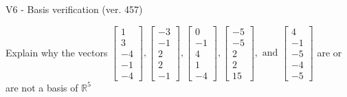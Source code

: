 \begin{exercise}
  \begin{exerciseTitle}V6 - Basis verification (ver. 457)\end{exerciseTitle}
  \begin{exerciseStatement}
    Explain why the vectors \(\left[\begin{array}{r}
1 \\
3 \\
-4 \\
-1 \\
-4
\end{array}\right] , \left[\begin{array}{r}
-3 \\
-1 \\
2 \\
2 \\
-1
\end{array}\right] , \left[\begin{array}{r}
0 \\
-1 \\
4 \\
1 \\
-4
\end{array}\right] , \left[\begin{array}{r}
-5 \\
-5 \\
2 \\
2 \\
15
\end{array}\right] , \text{ and } \left[\begin{array}{r}
4 \\
-1 \\
-5 \\
-4 \\
-5
\end{array}\right]\) are or are not a basis of \(\mathbb{R}^5\)	



\end{exerciseStatement}
\end{exercise}
